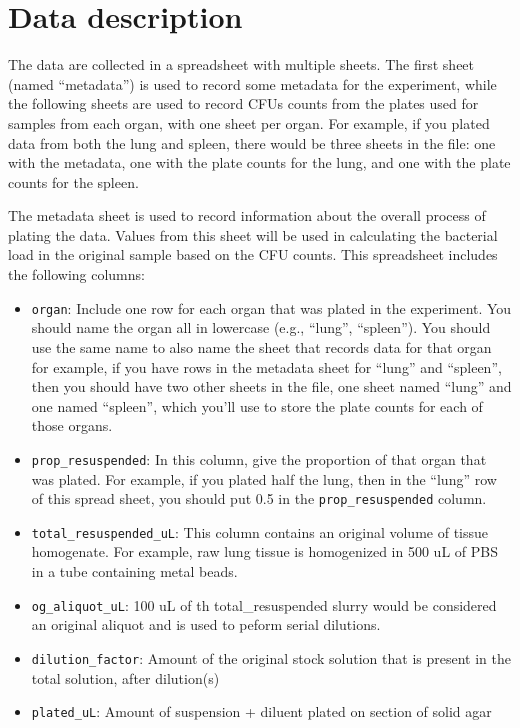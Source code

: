 \documentclass[
]{book}
\providecommand{\tightlist}{%
  \setlength{\itemsep}{0pt}\setlength{\parskip}{0pt}}
\begin{document}
\hypertarget{data-description}{%
\section{Data description}\label{data-description}}

The data are collected in a spreadsheet with multiple sheets. The first sheet
(named ``metadata'') is used to record some metadata for the experiment, while the
following sheets are used to record CFUs counts from the plates used for samples
from each organ, with one sheet per organ. For example, if you plated data
from both the lung and spleen, there would be three sheets in the file: one
with the metadata, one with the plate counts for the lung, and one with the
plate counts for the spleen.

The metadata sheet is used to record information about the overall process of
plating the data. Values from this sheet will be used in calculating the bacterial
load in the original sample based on the CFU counts. This spreadsheet includes
the following columns:

\begin{itemize}
\tightlist
\item
  \texttt{organ}: Include one row for each organ that was plated in the experiment.
  You should name the organ all in lowercase (e.g., ``lung'', ``spleen''). You
  should use the same name to also name the sheet that records data for that organ
  for example, if you have rows in the metadata sheet for ``lung'' and ``spleen'',
  then you should have two other sheets in the file, one sheet named ``lung'' and
  one named ``spleen'', which you'll use to store the plate counts for each of those
  organs.
\item
  \texttt{prop\_resuspended}: In this column, give the proportion of that organ that
  was plated. For example, if you plated half the lung, then in the ``lung'' row
  of this spread sheet, you should put 0.5 in the \texttt{prop\_resuspended} column.
\item
  \texttt{total\_resuspended\_uL}: This column contains an original volume of tissue homogenate. For example, raw lung tissue is homogenized in 500 uL of PBS in a tube containing metal beads.
\item
  \texttt{og\_aliquot\_uL}: 100 uL of th total\_resuspended slurry would be considered an original aliquot and is used to peform serial dilutions.
\item
  \texttt{dilution\_factor}: Amount of the original stock solution that is present in the total solution, after dilution(s)
\item
  \texttt{plated\_uL}: Amount of suspension + diluent plated on section of solid agar
\end{itemize}
\end{document}
